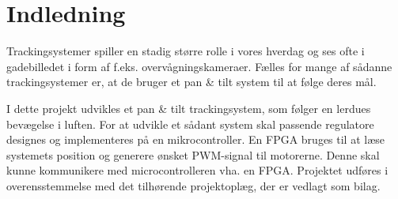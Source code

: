 \section*{Indledning}
Trackingsystemer spiller en stadig større rolle i vores hverdag og ses ofte i gadebilledet i form 
af f.eks. overvågningskameraer.
Fælles for mange af sådanne trackingsystemer er, at de bruger et pan \& tilt system til at følge deres mål. 

I dette projekt udvikles et pan \& tilt trackingsystem, som følger en lerdues bevægelse i 
luften. For at udvikle et sådant system skal passende regulatore designes og implementeres
på en mikrocontroller. 
En FPGA  bruges til at læse systemets position og generere ønsket PWM-signal til motorerne. 
Denne skal kunne kommunikere med microcontrolleren vha. en FPGA. 
Projektet udføres i overensstemmelse med det tilhørende projektoplæg, der er vedlagt 
som bilag.
